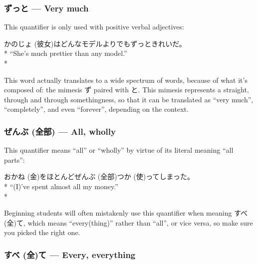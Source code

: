 \documentclass[11pt, b5paper, twoside, openright, onecolumn]{book}
\makeatletter
\newcommand*{\rubystack}[2]{{\relscale{0.5}%
  \begin{tabular}[b]{@{}c@{}}%
    {#1}\\%
   {\textscale{2}{#2}}%
  \end{tabular}}%
}
\DeclareRobustCommand*{\ruby}[2]{%
  \mbox{%
    \setlength{\parskip}{0ex}%
    \BeginAccSupp{method=pdfstringdef,ActualText={#1}}%
      \rubystack{\phantom{#2}}{#1}%
      \llap{%
        \rubystack{#2}{\phantom{#1}}%
      }%
    \EndAccSupp{}%
  }%
}
\renewcommand*{\ruby}[2]{#2 (#1)}%
\newenvironment{exampleblock}{
\setlength{\parindent}{0.6in}
\begin{minipage}[t]{\dimexpr\textwidth-\parindent}}
{\end{minipage}}
\makeatother
\begin{document}
\subsubsection{ずっと — Very much}


This quantifier is only used with positive verbal adjectives:

\vspace{0.4cm}
\begin{exampleblock}
\ruby{彼女}{かのじょ}はどんなモデルよりでもずっときれいだ。 \\* 
“She’s much prettier than any model.” \\* 
\end{exampleblock}
\vspace{0.2cm}

This word actually translates to a wide spectrum of words‚ because of what it’s composed of: the mimesis ず paired with と. This mimesis represents a straight‚ through and through somethingness‚ so that it can be translated as “very much”‚ “completely”‚ and even “forever”‚ depending on the context.

\subsubsection{\ruby{全部}{ぜんぶ} — All‚ wholly}

This quantifier means “all” or “wholly” by virtue of its literal meaning “all parts”:

\vspace{0.4cm}
\begin{exampleblock}
お\ruby{金}{かね}をほとんど\ruby{全部}{ぜんぶ}\ruby{使}{つか}ってしまった。 \\* 
“(I)’ve spent almost all my money.” \\* 
\end{exampleblock}
\vspace{0.2cm}

Beginning students will often mistakenly use this quantifier when meaning \ruby{全}{すべ}て‚ which means “every(thing)” rather than “all”‚ or vice versa‚ so make sure you picked the right one.

\subsubsection{\ruby{全}{すべ}て — Every‚ everything}
\end{document}
